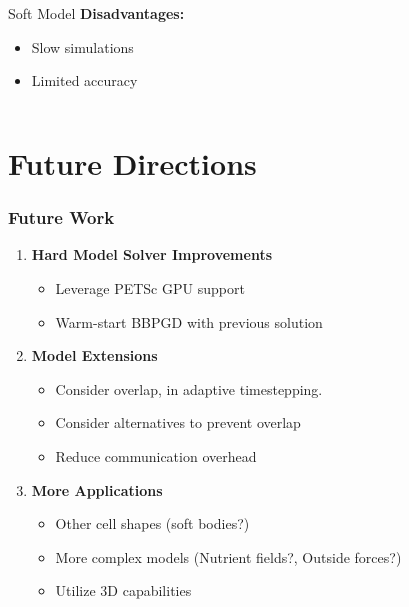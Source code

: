 \documentclass[10pt,t]{beamer}
\begin{document}
\begin{frame}
\begin{columns}
\begin{column}{0.5\textwidth}
\begin{alertblock}{Soft Model}
                \textbf{Disadvantages:}
                \begin{itemize}
                    \item Slow simulations
                    \item Limited accuracy
                \end{itemize}
            \end{alertblock}
        \end{column}
    \end{columns}

\end{frame}


\section{Future Directions}

\begin{frame}
    \frametitle{Future Work}

    \begin{enumerate}
        \item \textbf{Hard Model Solver Improvements}
              \begin{itemize}
                  \item Leverage PETSc GPU support
                  \item Warm-start BBPGD with previous solution
              \end{itemize}

              \vspace{0.3cm}

        \item \textbf{Model Extensions}
              \begin{itemize}
                  \item Consider overlap, in adaptive timestepping.
                  \item Consider alternatives to prevent overlap
                  \item Reduce communication overhead
              \end{itemize}

              \vspace{0.3cm}

        \item \textbf{More Applications}
              \begin{itemize}
                  \item Other cell shapes (soft bodies?)
                  \item More complex models (Nutrient fields?, Outside forces?)
                  \item Utilize 3D capabilities
              \end{itemize}
    \end{enumerate}

\end{frame}
\end{document}
